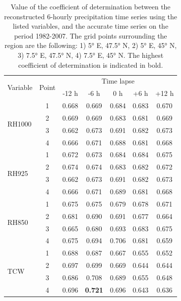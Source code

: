 \documentclass[hess, manuscript]{copernicus}
\begin{document}
\begin{table}[htb]
	\caption{Value of the coefficient of determination between the reconstructed 6-hourly precipitation time series using the listed variables, and the accurate time series on the period 1982-2007. The grid points surrounding the region are the following: 1) 5° E, 47.5° N, 2) 5° E, 45° N, 3) 7.5° E, 47.5° N, 4) 7.5° E, 45° N. The highest coefficient of determination is indicated in bold.}
	\begin{center}
		\begin{tabular}{l c c c c c c}
			\hline
			\multirow{2}{*}{Variable} & \multirow{2}{*}{Point} &  \multicolumn{5}{c}{Time lapse} \\
			&  & -12 h & -6 h & 0 h & +6 h & +12 h \\ 
			\hline
			\multirow{ 4}{*}{RH1000} & 1 & 0.668 & 0.669 & 0.684 & 0.683 & 0.670 \\
			& 2 & 0.669 & 0.669 & 0.683 & 0.681 & 0.669 \\
			& 3 & 0.662 & 0.673 & 0.691 & 0.682 & 0.673 \\
			& 4 & 0.666 & 0.671 & 0.688 & 0.681 & 0.668 \\ \hline
			\multirow{ 4}{*}{RH925} & 1 & 0.672 & 0.673 & 0.684 & 0.684 & 0.675 \\
			& 2 & 0.674 & 0.674 & 0.683 & 0.682 & 0.672 \\
			& 3 & 0.662 & 0.673 & 0.691 & 0.682 & 0.673 \\
			& 4 & 0.666 & 0.671 & 0.689 & 0.681 & 0.668 \\ \hline
			\multirow{ 4}{*}{RH850} & 1 & 0.675 & 0.675 & 0.679 & 0.678 & 0.671 \\
			& 2 & 0.681 & 0.690 & 0.691 & 0.677 & 0.664 \\
			& 3 & 0.665 & 0.680 & 0.693 & 0.683 & 0.675 \\
			& 4 & 0.675 & 0.694 & 0.706 & 0.681 & 0.659 \\ \hline
			\multirow{ 4}{*}{TCW} & 1 & 0.688 & 0.687 & 0.667 & 0.655 & 0.652 \\
			& 2 & 0.697 & 0.699 & 0.669 & 0.644 & 0.644 \\
			& 3 & 0.686 & 0.708 & 0.689 & 0.655 & 0.648 \\
			& 4 & 0.696 & \textbf{0.721} & 0.696 & 0.643 & 0.636 \\ \hline
		\end{tabular}
	\end{center}
	\label{table:proxy_correlations}
\end{table}
\end{document}
